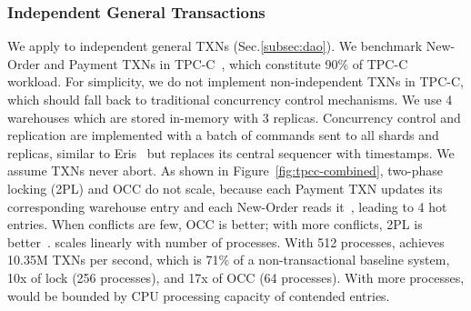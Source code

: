 \subsubsection{Independent General Transactions}
\label{subsec:eval-transactions}

We apply \sys to independent general TXNs (Sec.\ref{subsec:dao}).
We benchmark New-Order and Payment TXNs in TPC-C~\cite{tpcc}, which constitute 90\% of TPC-C workload.
For simplicity, we do not implement non-independent TXNs in TPC-C, which should fall back to traditional concurrency control mechanisms.
We use 4 warehouses which are stored in-memory with 3 replicas.
Concurrency control and replication are implemented with a batch of commands sent to all shards and replicas, similar to Eris~\cite{eris} but replaces its central sequencer with timestamps.
We assume TXNs never abort.
As shown in Figure~\ref{fig:tpcc-combined}, two-phase locking (2PL) and OCC do not scale, because each Payment TXN updates its corresponding warehouse entry and each New-Order reads it~\cite{yu2014staring}, leading to 4 hot entries.
When conflicts are few, OCC is better; with more conflicts, 2PL is better~\cite{mu2014extracting}.
\sys{} scales linearly with number of processes. With 512 processes, \sys achieves 10.35M TXNs per second, which is 71\% of a non-transactional baseline system, 10x of lock (256 processes), and 17x of OCC (64 processes). With more processes, \sys{} would be bounded by CPU processing capacity of contended entries.

